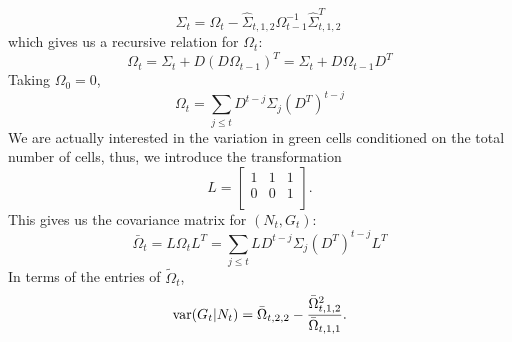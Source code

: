 \documentclass{article}
\begin{document}
 \begin{equation}
 \Sigma_t = \Omega_{t} - \hat{\Sigma}_{t,1,2} \Omega_{t-1}^{-1}\hat{\Sigma}_{t,1,2}^T\
 \end{equation}
 which gives us a recursive relation for $\Omega_t$: 
 \begin{equation}
 \Omega_{t} =  \Sigma_t + D(D\Omega_{t-1})^T =  \Sigma_t + D\Omega_{t-1}D^T
 \end{equation}
 Taking $\Omega_{0} = 0$, 
 \begin{equation}
  \Omega_{t} = \sum_{j\le t}D^{t-j}\Sigma_j \left(D^T\right)^{t-j}
 \end{equation}
 We are actually interested in the variation in green cells conditioned on the total number of cells, thus, we introduce the transformation 
 \begin{equation}
 L = \left[ \begin{array}{ccc}
1  & 1 &1 \\
0  & 0& 1 \\
\end{array}\right].
 \end{equation} 
 This gives us the covariance matrix for $(N_t,G_t)$:
 \begin{equation}
  \bar{\Omega}_{t} =L\Omega_t L^T =  \sum_{j\le t}LD^{t-j}\Sigma_j \left(D^T\right)^{t-j}L^T
 \end{equation}
 In terms of the entries of $ \tilde{\Omega}_{t}$, 
 \begin{equation}
 {\rm var}(G_t|N_t) = \bar{\Omega}_{t,2,2} - \frac{\bar{\Omega}_{t,1,2}^2}{ \bar{\Omega}_{t,1,1} }. 
 \end{equation}
 







\end{document}
